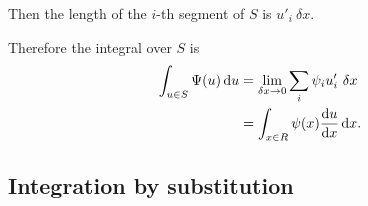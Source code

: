Then the length of the $i$-th segment of $S$ is $u'_i ~\delta x$.

Therefore the integral over $S$ is
\begin{align*}
  \int_{u \in S} \Psi(u) \du &= \lim_{\delta x \to 0} \sum_i \psi_iu'_i~\delta x\\
                            &= \int_{x \in R} \psi(x)\frac{\du}{\dx}\dx.
\end{align*}

\newpage
\subsection{Integration by substitution}


